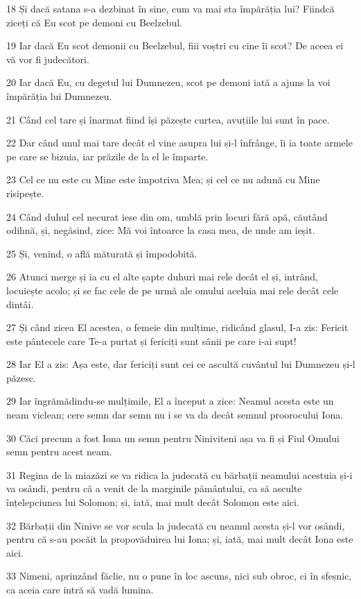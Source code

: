 \par 18 Și dacă satana s-a dezbinat în sine, cum va mai sta împărăția lui? Fiindcă ziceți că Eu scot pe demoni cu Beelzebul.
\par 19 Iar dacă Eu scot demonii cu Beelzebul, fiii voștri cu cine îi scot? De aceea ei vă vor fi judecători.
\par 20 Iar dacă Eu, cu degetul lui Dumnezeu, scot pe demoni iată a ajuns la voi împărăția lui Dumnezeu.
\par 21 Când cel tare și înarmat fiind își păzește curtea, avuțiile lui sunt în pace.
\par 22 Dar când unul mai tare decât el vine asupra lui și-l înfrânge, îi ia toate armele pe care se bizuia, iar prăzile de la el le împarte.
\par 23 Cel ce nu este cu Mine este împotriva Mea; și cel ce nu adună cu Mine risipește.
\par 24 Când duhul cel necurat iese din om, umblă prin locuri fără apă, căutând odihnă, și, negăsind, zice: Mă voi întoarce la casa mea, de unde am ieșit.
\par 25 Și, venind, o află măturată și împodobită.
\par 26 Atunci merge și ia cu el alte șapte duhuri mai rele decât el și, intrând, locuiește acolo; și se fac cele de pe urmă ale omului aceluia mai rele decât cele dintâi.
\par 27 Și când zicea El acestea, o femeie din mulțime, ridicând glasul, I-a zis: Fericit este pântecele care Te-a purtat și fericiți sunt sânii pe care i-ai supt!
\par 28 Iar El a zis: Așa este, dar fericiți sunt cei ce ascultă cuvântul lui Dumnezeu și-l păzesc.
\par 29 Iar îngrămădindu-se mulțimile, El a început a zice: Neamul acesta este un neam viclean; cere semn dar semn nu i se va da decât semnul proorocului Iona.
\par 30 Căci precum a fost Iona un semn pentru Niniviteni așa va fi și Fiul Omului semn pentru acest neam.
\par 31 Regina de la miazăzi se va ridica la judecată cu bărbații neamului acestuia și-i va osândi, pentru că a venit de la marginile pământului, ca să asculte înțelepciunea lui Solomon; și, iată, mai mult decât Solomon este aici.
\par 32 Bărbații din Ninive se vor scula la judecată cu neamul acesta și-l vor osândi, pentru că s-au pocăit la propovăduirea lui Iona; și, iată, mai mult decât Iona este aici.
\par 33 Nimeni, aprinzând făclie, nu o pune în loc ascuns, nici sub obroc, ci în sfeșnic, ca aceia care intră să vadă lumina.
